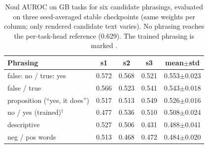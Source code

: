 \begin{table}[t]
\centering
\caption{Noul AUROC on GB tasks for six candidate phrasings, evaluated on three seed-averaged stable checkpoints (same weights per column; only rendered candidate text varies). No phrasing reaches the per-task-head reference (0.629). The trained phrasing is marked \dag.}
\label{tab:phrasing}
\small
\begin{tabular}{lcccc}
\toprule
Phrasing & s1 & s2 & s3 & mean$\pm$std \\ \midrule
false: no / true: yes & 0.572 & 0.568 & 0.521 & 0.553$\pm$0.023 \\
false / true & 0.566 & 0.523 & 0.541 & 0.543$\pm$0.018 \\
proposition (``yes, it does'') & 0.517 & 0.513 & 0.549 & 0.526$\pm$0.016 \\
no / yes (trained)$^\dagger$ & 0.477 & 0.536 & 0.510 & 0.508$\pm$0.024 \\
descriptive & 0.527 & 0.506 & 0.431 & 0.488$\pm$0.041 \\
neg / pos words & 0.513 & 0.468 & 0.472 & 0.484$\pm$0.020 \\
\bottomrule
\end{tabular}
\end{table}
